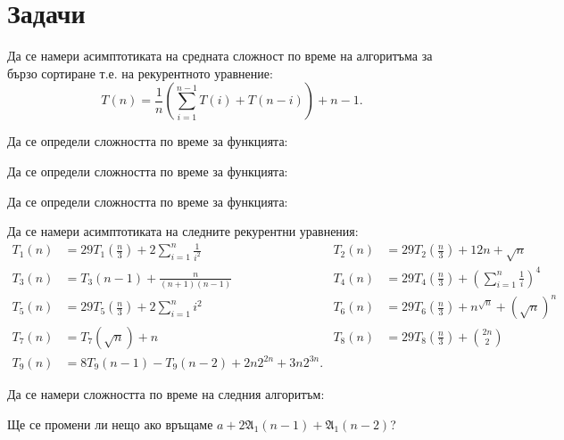 \section{Задачи}

\begin{problem}
Да се намери асимптотиката на средната сложност по време на алгоритъма за бързо сортиране т.е. на рекурентното уравнение:
\[
    T(n) = \frac{1}{n} \left(\sum\limits_{i = 1}^{n - 1}T(i) + T(n - i)\right) + n - 1.
\]
\end{problem}

\begin{problem}
Да се определи сложността по време за функцията:

\end{problem}

\begin{problem}
Да се определи сложността по време за функцията:

\end{problem}

\begin{problem}
Да се определи сложността по време за функцията:

\end{problem}

\begin{problem}
Да се намери асимптотиката на следните рекурентни уравнения:
\begin{align*}
    T_1(n) & = 29T_1(\frac{n}{3}) + 2 \sum\limits_{i = 1}^n \frac{1}{i^2} & T_2(n) & = 29T_2(\frac{n}{3}) + 12n + \sqrt{n}                        \\
    T_3(n) & = T_3(n - 1) + \frac{n}{(n + 1)(n - 1)}                      & T_4(n) & = 29T_4(\frac{n}{3}) + (\sum\limits_{i = 1}^n \frac{1}{i})^4 \\
    T_5(n) & = 29T_5(\frac{n}{3}) + 2 \sum\limits_{i = 1}^n i^2           & T_6(n) & = 29T_6(\frac{n}{3}) + n^{\sqrt{n}} + (\sqrt{n})^n           \\
    T_7(n) & = T_7(\sqrt{n}) + n                                          & T_8(n) & = 29T_8(\frac{n}{3}) + \binom{2n}{2}                         \\
    T_9(n) & = 8T_9(n - 1) - T_9(n - 2) + 2n2^{2n} + 3n2^{3n}.            &        &
\end{align*}
\end{problem}

\newpage

\begin{problem}
Да се намери сложността по време на следния алгоритъм:

Ще се промени ли нещо ако връщаме $a + 2 \mathfrak{A}_1(n - 1) + \mathfrak{A}_1(n - 2)$?
\end{problem}

